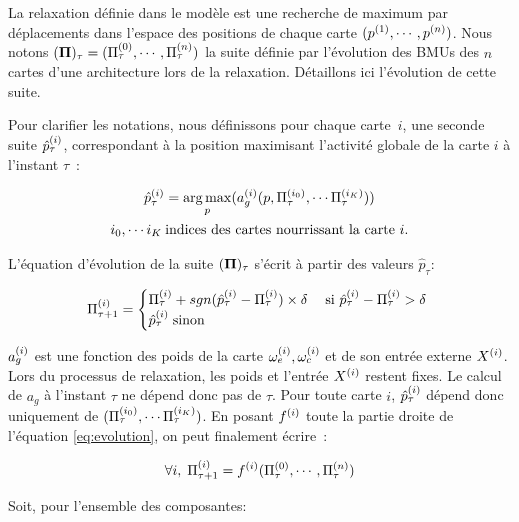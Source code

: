 \documentclass[../main]{subfiles}
\begin{document}
La relaxation définie dans le modèle est une recherche de maximum par déplacements dans l'espace des positions de chaque carte $(p^{({1})},\cdots, p^{({n})})$.
Nous notons $(\mathbf{\Pi})_\tau = (\Pi^{({0})}_\tau,\cdots,\Pi^{({n})}_\tau)$ la suite définie par l'évolution des BMUs des $n$ cartes d'une architecture lors de la relaxation.
Détaillons ici l'évolution de cette suite.

Pour clarifier les notations, nous définissons  pour chaque carte~$i$, une seconde suite $\hat{p}^{({i})}_\tau$, correspondant à la position maximisant l'activité globale de la carte $i$ à l'instant $\tau$~:

\begin{equation}
\begin{gathered}
\hat{p}^{({i})}_{\tau} = \operatorname*{arg\,max}_p(a_g^{({i})}(p,\Pi^{({i_0})}_\tau, \cdots \Pi^{({i_K})}_\tau))\\
 i_0, \cdots i_K \: \text{indices des cartes nourrissant la carte $i$}.
\end{gathered}
\label{eq:pstar}
\end{equation}

L'équation d'évolution de la suite $(\mathbf{\Pi})_\tau$ s'écrit à partir des valeurs $\hat{p}_\tau$:

\begin{equation}
\Pi^{({i})}_{\tau+1} = 
\begin{cases}
\Pi^{({i})}_{\tau} + sgn(\hat{p}^{({i})}_{\tau} - \Pi^{({i})}_{\tau}) \times \delta \; & \text{si $\hat{p}^{({i})}_{\tau} - \Pi^{({i})}_{\tau} > \delta$ } \\
\hat{p}^{({i})}_{\tau} \; \text{sinon}	
\end{cases}
\label{eq:evolution}
\end{equation}

$a_g^{({i})}$ est une fonction des poids de la carte $\omega_{e}^{({i})}, \omega_{c}^{({i})}$ et de son entrée externe $X^{({i})}$. 
Lors du processus de relaxation, les poids et l'entrée $X^{({i})}$ restent fixes. 
Le calcul de $a_g$ à l'instant $\tau$ ne dépend donc pas de $\tau$.
Pour toute carte $i$, $\hat{p}^{({i})}_{\tau}$ dépend donc uniquement de $(\Pi^{({i_0})}_\tau, \cdots \Pi^{({i_K})}_\tau)$. 
En posant $f^{({i})}$ toute la partie droite de l'équation \ref{eq:evolution}, on peut finalement écrire~:

\begin{equation}
\forall i, \; \Pi^{({i})}_{\tau +1} = f^{({i})}(\Pi^{({0})}_\tau,\cdots,\Pi^{({n})}_\tau)
\label{eq:fonction}
\end{equation}

Soit, pour l'ensemble des composantes: 
\end{document}
